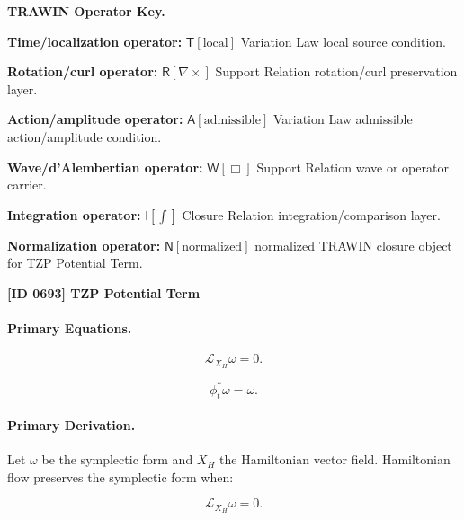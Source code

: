 \par\vspace{0.45\baselineskip}
\noindent\begin{minipage}[t]{\linewidth}
\begingroup
\small
\raggedright
\textbf{TRAWIN Operator Key.}\par
\noindent\textbf{Time/localization operator:} $\mathsf{T}\!\left[\mathrm{local}\right]$ Variation Law local source condition.\par
\noindent\textbf{Rotation/curl operator:} $\mathsf{R}\!\left[\nabla\times\right]$ Support Relation rotation/curl preservation layer.\par
\noindent\textbf{Action/amplitude operator:} $\mathsf{A}\!\left[\mathrm{admissible}\right]$ Variation Law admissible action/amplitude condition.\par
\noindent\textbf{Wave/d'Alembertian operator:} $\mathsf{W}\!\left[\Box\right]$ Support Relation wave or operator carrier.\par
\noindent\textbf{Integration operator:} $\mathsf{I}\!\left[\int\right]$ Closure Relation integration/comparison layer.\par
\noindent\textbf{Normalization operator:} $\mathsf{N}\!\left[\mathrm{normalized}\right]$ normalized TRAWIN closure object for TZP Potential Term.\par
\endgroup
\end{minipage}

\clearpage
\noindent\textbf{[ID 0693] TZP Potential Term}\par
\vspace{0.35em}
\paragraph{Primary Equations.}
\begin{equation}
\mathcal{L}_{X_H}\omega=0.
\end{equation}

\begin{equation}
\phi_t^{*}\omega=\omega.
\end{equation}

\paragraph{Primary Derivation.}
Let $\omega$ be the symplectic form and $X_H$ the Hamiltonian vector field.  
Hamiltonian flow preserves the symplectic form when:

\begin{equation}
\mathcal{L}_{X_H}\omega=0.
\end{equation}

